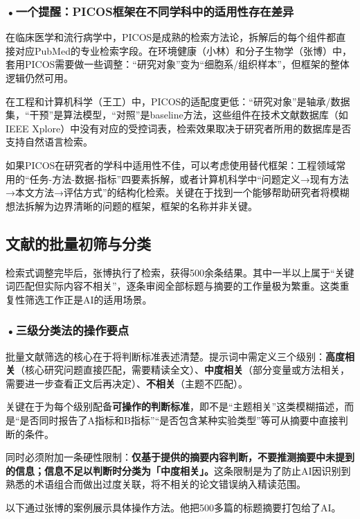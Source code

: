 \subsubsection*{\textbf{•一个提醒：PICOS框架在不同学科中的适用性存在差异}}在临床医学和流行病学中，PICOS是成熟的检索方法论，拆解后的每个组件都直接对应PubMed的专业检索字段。在环境健康（小林）和分子生物学（张博）中，套用PICOS需要做一些调整：``研究对象''变为``细胞系/组织样本''，但框架的整体逻辑仍然可用。

在工程和计算机科学（王工）中，PICOS的适配度更低：``研究对象''是轴承/数据集，``干预''是算法模型，``对照''是baseline方法，这些组件在技术文献数据库（如IEEE Xplore）中没有对应的受控词表，检索效果取决于研究者所用的数据库是否支持自然语言检索。

如果PICOS在研究者的学科中适用性不佳，可以考虑使用替代框架：工程领域常用的``任务-方法-数据-指标''四要素拆解，或者计算机科学中``问题定义→现有方法→本文方法→评估方式''的结构化检索。关键在于找到一个能够帮助研究者将模糊想法拆解为边界清晰的问题的框架，框架的名称并非关键。



\subsection{文献的批量初筛与分类}

检索式调整完毕后，张博执行了检索，获得500余条结果。其中一半以上属于``关键词匹配但实际内容不相关''，逐条审阅全部标题与摘要的工作量极为繁重。这类重复性筛选工作正是AI的适用场景。

\subsubsection*{\textbf{•三级分类法的操作要点}}批量文献筛选的核心在于将判断标准表述清楚。提示词中需定义三个级别：\textbf{高度相关}（核心研究问题直接匹配，需要精读全文）、\textbf{中度相关}（部分变量或方法相关，需要进一步查看正文后再决定）、\textbf{不相关}（主题不匹配）。

关键在于为每个级别配备\textbf{可操作的判断标准}，即不是``主题相关''这类模糊描述，而是``是否同时报告了A指标和B指标''``是否包含某种实验类型''等可从摘要中直接判断的条件。

同时必须附加一条硬性限制：\textbf{仅基于提供的摘要内容判断，不要推测摘要中未提到的信息；信息不足以判断时分类为「中度相关」。}这条限制是为了防止AI因识别到熟悉的术语组合而做出过度关联，将不相关的论文错误纳入精读范围。

以下通过张博的案例展示具体操作方法。他把500多篇的标题摘要打包给了AI。

